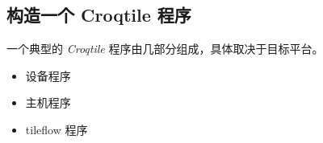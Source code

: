 \subsection*{构造一个 Croqtile 程序}

一个典型的 \emph{Croqtile} 程序由几部分组成，具体取决于目标平台。

\begin{itemize}[leftmargin=1.6em]
\item 设备程序
\item 主机程序
\item tileflow 程序
\end{itemize}
